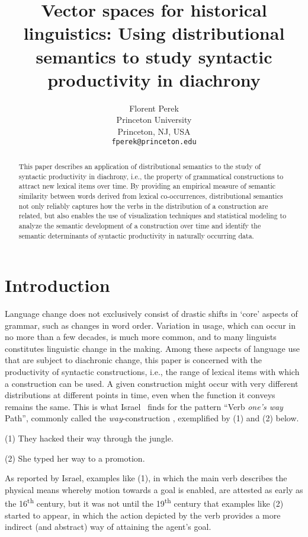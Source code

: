 \documentclass[11pt]{article}
\title{Vector spaces for historical linguistics: Using distributional semantics to study syntactic productivity in diachrony}
\author{Florent Perek \\
  Princeton University \\
  Princeton, NJ, USA \\
  {\tt fperek@princeton.edu} \\}
\begin{document}
\maketitle
\begin{abstract}
This paper describes an application of distributional semantics to the study of syntactic productivity in diachrony, i.e., the property of grammatical constructions to attract new lexical items over time. By providing an empirical measure of semantic similarity between words derived from lexical co-occurrences, distributional semantics not only reliably captures how the verbs in the distribution of a construction are related, but also enables the use of visualization techniques and statistical modeling to analyze the semantic development of a construction over time and identify the semantic determinants of syntactic productivity in naturally occurring data.
\end{abstract}

\section{Introduction}

Language change does not exclusively consist of drastic shifts in `core' aspects of grammar, such as changes in word order. Variation in usage, which can occur in no more than a few decades, is much more common, and to many linguists constitutes linguistic change in the making. Among these aspects of language use that are subject to diachronic change, this paper is concerned with the productivity of syntactic constructions, i.e., the range of lexical items with which a construction can be used. A given construction might occur with very different distributions at different points in time, even when the function it conveys remains the same. This is what Israel~ finds for the pattern ``Verb \textit{one's way} Path'', commonly called the \textit{way}-construction \cite{Goldberg1995}, exemplified by (1) and (2) below.

\begin{itemize*}
\item[(1)] They hacked their way through the jungle.
\item[(2)] She typed her way to a promotion.
\end{itemize*}
	
As reported by Israel, examples like (1), in which the main verb describes the physical means whereby motion towards a goal is enabled, are attested as early as the 16\textsuperscript{th} century, but it was not until the 19\textsuperscript{th} century that examples like (2) started to appear, in which the action depicted by the verb provides a more indirect (and abstract) way of attaining the agent's goal.
\end{document}
